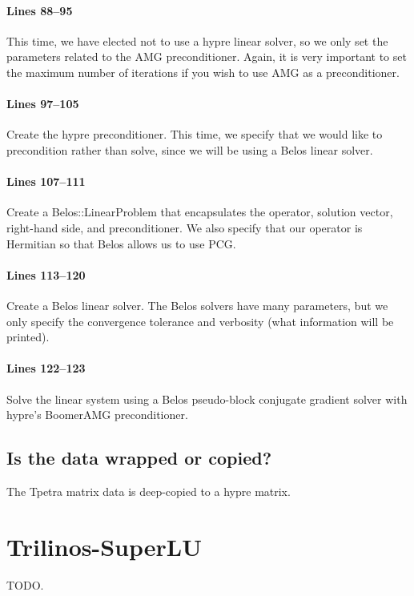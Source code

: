 \documentclass[pdf,12pt,report,strict]{SANDreport}
\begin{document}
\paragraph{Lines 88--95}
This time, we have elected not to use a hypre linear solver, so we only set the
parameters related to the AMG preconditioner.  Again, it is very important to
set the maximum number of iterations if you wish to use AMG as a preconditioner.

\paragraph{Lines 97--105}
Create the hypre preconditioner.  This time, we specify that we would like to
precondition rather than solve, since we will be using a Belos linear solver.

\paragraph{Lines 107--111}
Create a Belos::LinearProblem that encapsulates the operator, solution vector,
right-hand side, and preconditioner.  We also specify that our operator is
Hermitian so that Belos allows us to use PCG.

\paragraph{Lines 113--120}
Create a Belos linear solver.  The Belos solvers have many parameters, but we
only specify the convergence tolerance and verbosity (what information will be
printed).

\paragraph{Lines 122--123}
Solve the linear system using a Belos pseudo-block conjugate gradient solver
with hypre's BoomerAMG preconditioner.

\subsection{Is the data wrapped or copied?}
The Tpetra matrix data is deep-copied to a hypre matrix.

\section{Trilinos-SuperLU}
{\color{red}TODO.}
\end{document}

